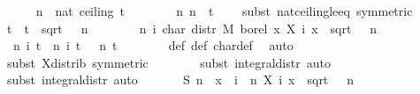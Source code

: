 \documentclass{svjour3}
\begin{document}
{\begin{isabellebody}
\ \ \ \ \isamarkupfalse%
\ {\isachardoublequoteopen}n\ {\isasymge}\ nat\ {\isacharparenleft}ceiling\ {\isacharparenleft}t{\isacharcircum}{}\ {\isacharslash}\ {}{\isacharparenright}{\isacharparenright}{\isachardoublequoteclose}\isanewline
\ \ \ \ \isamarkupfalse%
\ n{\isacharcolon}\ {\isachardoublequoteopen}n\ {\isasymge}\ t{\isacharcircum}{}\ {\isacharslash}\ {}{\isachardoublequoteclose}\ \isamarkupfalse%
\ {\isacharparenleft}subst\ nat{\isacharunderscore}ceiling{\isacharunderscore}le{\isacharunderscore}eq\ {\isacharbrackleft}symmetric{\isacharbrackright}{\isacharparenright}\isanewline
\ \ \ \ \isamarkupfalse%
\ {\isacharquery}t\ {\isacharequal}\ {\isachardoublequoteopen}t\ {\isacharslash}\ sqrt\ {\isacharparenleft}{\isasymsigma}\ {\isacharasterisk}\ n{\isacharparenright}{\isachardoublequoteclose}\isanewline
\isanewline
\ \ \ \ \isamarkupfalse%
\ {\isasympsi}{\isacharprime}\ {\isasymequiv}\ {\isachardoublequoteopen}{\isasymlambda}n\ i{\isachardot}\ char\ {\isacharparenleft}distr\ M\ borel\ {\isacharparenleft}{\isasymlambda}x{\isachardot}\ X\ i\ x\ {\isacharslash}\ sqrt\ {\isacharparenleft}{\isasymsigma}\ {\isacharasterisk}\ n{\isacharparenright}{\isacharparenright}{\isacharparenright}{\isachardoublequoteclose}\isanewline
\ \ \ \ \isamarkupfalse%
\ {\isacharasterisk}{\isacharcolon}\ {\isachardoublequoteopen}{\isasymAnd}n\ i\ t{\isachardot}\ {\isasympsi}{\isacharprime}\ n\ i\ t\ {\isacharequal}\ {\isasympsi}\ n\ t{\isachardoublequoteclose}\isanewline
\ \ \ \ \ \ \isamarkupfalse%
\ {\isasympsi}{\isacharunderscore}def\ {\isasympsi}{\isacharprime}{\isacharunderscore}def\ char{\isacharunderscore}def\ \isamarkupfalse%
\ auto\isanewline
\ \ \ \ \ \ \isamarkupfalse%
\ {\isacharparenleft}subst\ X{\isacharunderscore}distrib\ {\isacharbrackleft}symmetric{\isacharbrackright}{\isacharparenright}\isanewline
\ \ \ \ \ \ \isamarkupfalse%
\ {\isacharparenleft}subst\ integral{\isacharunderscore}distr{\isacharcomma}\ auto{\isacharparenright}\isanewline
\ \ \ \ \ \ \isamarkupfalse%
\ {\isacharparenleft}subst\ integral{\isacharunderscore}distr{\isacharcomma}\ auto{\isacharparenright}\isanewline
\isanewline
\ \ \ \ \isamarkupfalse%
\ {}{\isacharcolon}\ {\isachardoublequoteopen}S{\isacharprime}\ n\ {\isacharequal}\ {\isacharparenleft}{\isasymlambda}x{\isachardot}\ {\isacharparenleft}{\isasymSum}\ i\ {\isacharless}\ n{\isachardot}\ X\ i\ x\ {\isacharslash}\ sqrt\ {\isacharparenleft}{\isasymsigma}\ {\isacharasterisk}\ n{\isacharparenright}{\isacharparenright}{\isacharparenright}{\isachardoublequoteclose}\ \isanewline

\end{isabellebody}}
\end{document}
